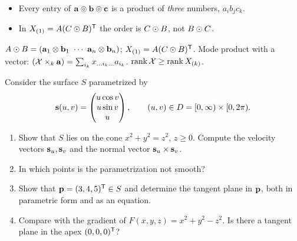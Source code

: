 \begin{solution}
\begin{trap}
\begin{itemize}
\item Every entry of $\mathbf{a}\circledcirc\mathbf{b}\circledcirc\mathbf{c}$ is a product of \emph{three} numbers, $a_ib_jc_k$.
\item In $X_{(1)}=A(C\odot B)^{\mathsf{T}}$ the order is $C\odot B$, not $B\odot C$.
\end{itemize}
\end{trap}
\begin{heart}
$A\odot B=(\mathbf{a}_1\otimes\mathbf{b}_1\ \cdots\ \mathbf{a}_n\otimes\mathbf{b}_n)$; $X_{(1)}=A(C\odot B)^{\mathsf{T}}$. Mode product with a vector: $(\mathcal{X}\times_k\mathbf{a})=\sum_{i_k}x_{\dots i_k\dots}a_{i_k}$. $\operatorname{rank}\mathcal{X}\ge\operatorname{rank} X_{(k)}$.
\end{heart}
\end{solution}

Consider the surface $S$ parametrized by
\[
\mathbf{s}(u,v)=\begin{pmatrix}u\cos v\\u\sin v\\u\end{pmatrix},\qquad (u,v)\in D=[0,\infty)\times[0,2\pi).
\]
\begin{enumerate}
\item Show that $S$ lies on the cone $x^2+y^2=z^2$, $z\ge0$. Compute the velocity vectors $\mathbf{s}_u,\mathbf{s}_v$ and the normal vector $\mathbf{s}_u\times\mathbf{s}_v$.
\item In which points is the parametrization not smooth?
\item Show that $\mathbf{p}=(3,4,5)^{\mathsf{T}}\in S$ and determine the tangent plane in $\mathbf{p}$, both in parametric form and as an equation.
\item Compare with the gradient of $F(x,y,z)=x^2+y^2-z^2$. Is there a tangent plane in the apex $(0,0,0)^{\mathsf{T}}$?
\end{enumerate}

